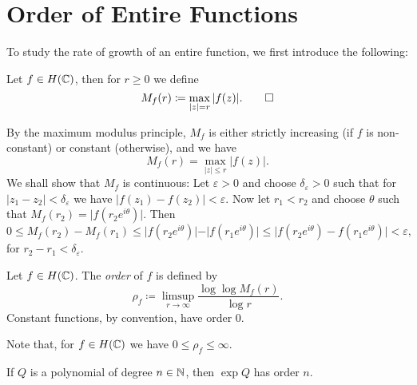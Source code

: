\section{Order of Entire Functions} \label{sec:order}

To study the rate of growth of an entire function, we first introduce the following:
\begin{definition}
    Let $f \in H(\mathbb{C})$, then for $r \geq 0$ we define
    \begin{equation*}
        M_f(r) \coloneqq \max_{\vert z \vert = r} \vert f(z) \vert. \qedhere
    \end{equation*}
\end{definition}

\begin{remark}    
    By the maximum modulus principle, $M_f$ is either strictly increasing (if $f$ is non-constant) or constant (otherwise), and we have
    $$ M_f(r) = \max_{\vert z \vert \leq r} \vert f(z) \vert. $$
    We shall show that $M_f$ is continuous: Let $\varepsilon > 0$ and choose $\delta_\varepsilon > 0$ such that for ${\vert z_1 - z_2 \vert < \delta_\varepsilon}$ we have ${\vert f(z_1) - f(z_2) \vert < \varepsilon}$. Now let $r_1 < r_2$ and choose $\theta$ such that $M_f(r_2) = \vert f(r_2 e^{i \theta}) \vert$. Then
    \begin{equation*}
        0 \leq M_f(r_2) - M_f(r_1) \leq \vert f(r_2 e^{i \theta}) \vert - \vert f(r_1 e^{i \theta}) \vert \leq \vert f(r_2 e^{i \theta}) - f(r_1 e^{i \theta}) \vert < \varepsilon,
    \end{equation*}
    for $r_2 - r_1 < \delta_\varepsilon$.
\end{remark}

\begin{definition} \label{def:order}
    Let $f \in H(\mathbb{C})$. The \emph{order} of $f$ is defined by
    \begin{equation} \label{eq:def-order}
        \rho_f \coloneqq \limsup_{r \to \infty} \frac{\log \log M_f(r)}{\log r}.
    \end{equation}
    Constant functions, by convention, have order 0.
\end{definition}

Note that, for $f \in H(\mathbb{C})$ we have $0 \leq \rho_f \leq \infty$.

\begin{proposition} \label{prop:order-exponential-polynomial}
    If $Q$ is a polynomial of degree $n \in \mathbb{N}$, then $\exp Q$ has order $n$.
\end{proposition}

